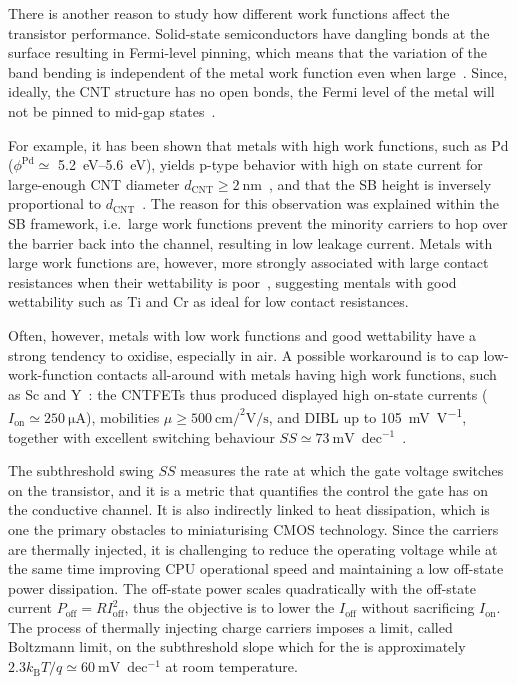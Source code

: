 There is another reason to study how different work functions affect the transistor performance. Solid-state semiconductors have dangling bonds at the surface resulting in Fermi-level pinning, which means that the variation of the band bending is independent of the metal work function even when large~\cite{sankey1984si}. Since, ideally, the \gls{CNT} structure has no open bonds, the Fermi level of the metal will not be pinned to mid-gap states~\cite{bachtold2001logic, svensson2009dependence}.

For example, it has been shown that metals with high work functions, such as Pd ($\phi^\textrm{Pd}\simeq$ \SIrange{5.2}{5.6}{\electronvolt}), yields p-type behavior with high on state current for large-enough \gls{CNT} diameter $d_\textrm{CNT}\ge\SI{2}{\nano\metre}$~\cite{leonard2000role}, and that the \gls{SB} height is inversely proportional to $d_\textrm{CNT}$~\cite{svensson2009dependence}. The reason for this observation was explained within the \gls{SB} framework, i.e.\ large work functions prevent the minority carriers to hop over the barrier back into the channel, resulting in low leakage current. Metals with large work functions are, however, more strongly associated with large contact resistances when their wettability is poor~\cite{lim2009contact}, suggesting mentals with good wettability such as Ti and Cr as ideal for low contact resistances.

Often, however, metals with low work functions and good wettability have a strong tendency to oxidise, especially in air. A possible workaround is to cap low-work-function contacts all-around with metals having high work functions, such as Sc and Y~\cite{ding2009contacted}: the \glspl{CNTFET} thus produced displayed high on-state currents ($I_\textrm{on}\simeq\SI{250}{\micro\ampere}$), mobilities $\mu\ge\SI{500}{\cm\square\per\V\per\second}$, and \gls{DIBL} up to \SI{105}{\si{\mV\per\V}}, together with excellent switching behaviour $SS\simeq\SI{73}{\milli\volt}$~dec$^{-1}$~\cite{ding2009contacted,peng2019carbon}.

The subthreshold swing $SS$ measures the rate at which the gate voltage switches on the transistor, and it is a metric that quantifies the control the gate has on the conductive channel. It is also indirectly linked to heat dissipation, which is one the primary obstacles to miniaturising \gls{CMOS} technology. Since the carriers are thermally injected, it is challenging to reduce the operating voltage while at the same time improving CPU operational speed and maintaining a low off-state power dissipation. The off-state power scales quadratically with the off-state current $P_\textrm{off} = RI^2_\textrm{off}$, thus the objective is to lower the $I_\textrm{off}$ without sacrificing $I_\textrm{on}$. The process of thermally injecting charge carriers imposes a limit, called Boltzmann limit, on the subthreshold slope which for the is approximately $2.3 k_\textrm{B}T/q\simeq\SI{60}{\milli\volt}$~dec$^{-1}$ at room temperature.

